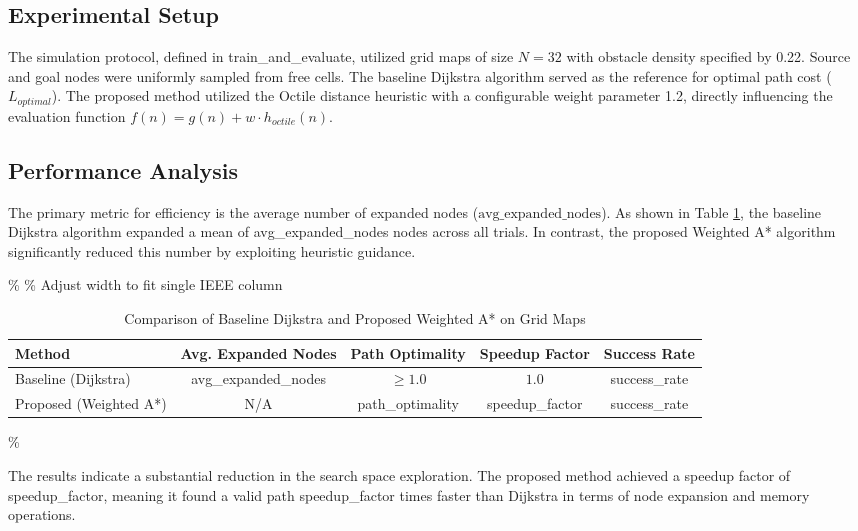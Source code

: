 \documentclass[conference]{IEEEtran}
\renewcommand{\texttt}[1]{{\normalfont\ttfamily #1}}
\begin{document}
\subsection{Experimental Setup}
The simulation protocol, defined in train\_and\_evaluate, utilized grid maps of size $N = \text{32}$ with obstacle density specified by 0.22. Source and goal nodes were uniformly sampled from free cells. The baseline Dijkstra algorithm served as the reference for optimal path cost ($L_{optimal}$). The proposed method utilized the Octile distance heuristic with a configurable weight parameter 1.2, directly influencing the evaluation function $f(n) = g(n) + w \cdot h_{octile}(n)$.

\subsection{Performance Analysis}
The primary metric for efficiency is the average number of expanded nodes ($\text{avg\_expanded\_nodes}$). As shown in Table \ref{tab:results}, the baseline Dijkstra algorithm expanded a mean of \texttt{avg\_expanded\_nodes} nodes across all trials. In contrast, the proposed Weighted A* algorithm significantly reduced this number by exploiting heuristic guidance.

\begin{table}[htbp]
    \centering
    \caption{Comparison of Baseline Dijkstra and Proposed Weighted A* on Grid Maps}
    \label{tab:results}
    \%  \% Adjust width to fit single IEEE column
        \begin{tabular}{l|c|c|c|c}
            \hline
            \textbf{Method} & \textbf{Avg. Expanded Nodes} & \textbf{Path Optimality} & \textbf{Speedup Factor} & \textbf{Success Rate} \\ \hline
            Baseline (Dijkstra) & \texttt{avg\_expanded\_nodes} & $\ge 1.0$ & $1.0$ & \texttt{success\_rate} \\ \hline
            Proposed (Weighted A*) & N/A & \texttt{path\_optimality} & \texttt{speedup\_factor} & \texttt{success\_rate} \\ \hline
        \end{tabular}\%
\end{table}

The results indicate a substantial reduction in the search space exploration. The proposed method achieved a speedup factor of \texttt{speedup\_factor}, meaning it found a valid path \texttt{speedup\_factor} times faster than Dijkstra in terms of node expansion and memory operations.
\end{document}

